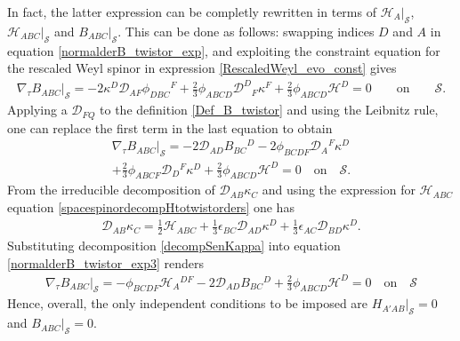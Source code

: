 \documentclass[10pt,a4paper]{article}
\theoremstyle{plain}
\begin{document}
In fact, the latter expression can be completly rewritten in terms of
$\mathcal{H}_A|_{\mathcal{S}}$, $\mathcal{H}_{ABC}|_{\mathcal{S}}$ and
$B_{ABC}|_{\mathcal{S}}$. This can be done as follows: swapping
indices $D$ and $A$ in equation \eqref{normalderB_twistor_exp}, and
exploiting the constraint equation for the rescaled Weyl spinor in
expression \eqref{RescaledWeyl_evo_const} gives
\begin{align}\label{normalderB_twistor_exp2}
\nabla_{\tau}B_{ABC}|_{\mathcal{S}}= -2 \kappa ^{D} \mathcal{D}
_{AF}\phi _{DBC}{}^{F} + \tfrac{2}{3} \phi _{ABCD} \mathcal{D}
^{D}{}_{F}\kappa ^{F} + \tfrac{2}{3}\phi_{ABCD}\mathcal{H}^D = 0
\qquad \text{on} \qquad \mathcal{S}.
\end{align}
Applying a $\mathcal{D}_{FQ}$ to the definition \eqref{Def_B_twistor}
and using the Leibnitz rule, one can replace the first term in the
last equation to obtain
\begin{multline}\label{normalderB_twistor_exp3}
\nabla_{\tau}B_{ABC}|_{\mathcal{S}}= -2 \mathcal{D} _{AD}B_{BC}{}^{D}
-2 \phi _{BCDF} \mathcal{D} _{A}{}^{F}\kappa ^{D} \\+\tfrac{2}{3} \phi
_{ABCF} \mathcal{D} _{D}{}^{F}\kappa ^{D} +
\tfrac{2}{3}\phi_{ABCD}\mathcal{H}^D = 0 \quad \text{on} \quad
\mathcal{S}.
\end{multline}
From the irreducible decomposition of $\mathcal{D} _{AB}\kappa _{C}$
and using the expression for $\mathcal{H}_{ABC}$ equation
\eqref{spacespinordecompHtotwistorders} one has
\begin{align}\label{decompSenKappa}
\mathcal{D} _{AB}\kappa _{C} = \tfrac{1}{2} \mathcal{H} _{ABC} +
\tfrac{1}{3} \epsilon _{BC} \mathcal{D} _{AD}\kappa ^{D} +
\tfrac{1}{3} \epsilon _{AC} \mathcal{D} _{BD}\kappa ^{D}.
\end{align}
Substituting decomposition \eqref{decompSenKappa} into equation
\eqref{normalderB_twistor_exp3} renders
\begin{align}
\nabla_{\tau}B_{ABC}|_{\mathcal{S}}=- \phi _{BCDF} \mathcal{H}
_{A}{}^{DF} -2 \mathcal{D} _{AD}B_{BC}{}^{D} +
\tfrac{2}{3}\phi_{ABCD}\mathcal{H}^D = 0 \quad \text{on} \quad
\mathcal{S}
\end{align}
Hence, overall, the only independent conditions to be imposed are
$H_{A'AB}|_{\mathcal{S}}=0$ and $B_{ABC}|_{\mathcal{S}}=0$.  \\
\end{document}
